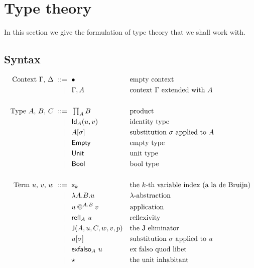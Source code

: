 \section{Type theory}
\label{sec:type-theory}

In this section we give the formulation of type theory that we shall work with.

\subsection{Syntax}
\label{sec:syntax}

\begin{align*}
  \text{Context $\G$, $\D$}
    \bnf   {}& \ctxempty                && \text{empty context} \\
    \bnfor {}& \ctxextend{\G}{\A}       && \text{context $\G$ extended with $\A$} \\
  \\
  \text{Type $\A$, $\B$, $\C$}
    \bnf   {}& \Prod{\A} \B             && \text{product}\\
    \bnfor {}& \Id{\A}{\uu}{\vv}        && \text{identity type} \\
    \bnfor {}& \subst{\A}{\sbs}         && \text{substitution $\sbs$ applied to $\A$} \\
    \bnfor {}& \Empty                   && \text{empty type} \\
    \bnfor {}& \Unit                    && \text{unit type} \\
    \bnfor {}& \Bool                    && \text{bool type} \\
  \\
  \text{Term $\uu$, $\vv$, $\ww$}
    \bnf   {}& \var{k}                  && \text{the $k$-th variable index (a la de Bruijn)} \\
    \bnfor {}& \lam{\A}{\B} \uu         && \text{$\lambda$-abstraction} \\
    \bnfor {}& \app{\uu}{\A}{\B}{\vv}   && \text{application} \\
    \bnfor {}& \refl{\A} \uu            && \text{reflexivity} \\
    \bnfor {}& \J{\A}{\uu}{\C}{\ww}{\vv}{\p} && \text{the J eliminator} \\
    \bnfor {}& \subst{\uu}{\sbs}        && \text{substitution $\sbs$ applied to $\uu$} \\
    \bnfor {}& \exfalso{\A} \uu         && \text{ex falso quod libet} \\
    \bnfor {}& \unit                    && \text{the unit inhabitant} \\

\end{align*}
